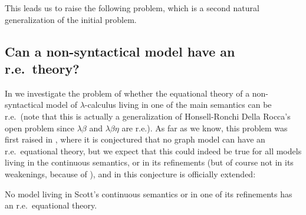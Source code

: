 \documentclass[english]{llncs}
\begin{document}
This leads us to raise the following problem, which is a second natural generalization of the initial problem.

\subsection{Can a non-syntactical model have an r.e.\ theory?} 

In \cite[Chapter~6]{ManzonettoTh} we investigate the problem of whether the equational theory of a non-syntactical model of $\lambda$-calculus living in one of the main semantics can be r.e.\ 
(note that this is actually a generalization of Honsell-Ronchi Della Rocca's open problem since $\lambda\beta$ and $\lambda\beta\eta$ are r.e.).
As far as we know, this problem was first raised in \cite{Berline06}, where it is conjectured that no graph model can have an r.e.\ equational theory,
but we expect that this could indeed be true for all models living in the continuous semantics, or in its refinements 
(but of course not in its weakenings, because of \cite{DiGianantonioHP95}), and in \cite{ManzonettoTh} this conjecture is officially extended:

\begin{conjecture}\label{conj:ScottSemantics} 
No model living in Scott's continuous semantics or in one of its refinements has an r.e.\ equational theory.
\end{conjecture}
\end{document}

